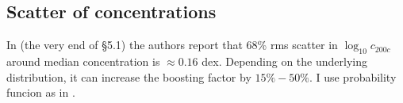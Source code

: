 \subsection{Scatter of concentrations}
In \cite{2014arXiv1407.4730D} (the very end of \S5.1) the authors report that 68\% rms scatter in $\log_{10}c_{200c}$ around median concentration is $\approx 0.16$ dex. Depending on the underlying distribution, it can increase the boosting factor by $15\%-50\%$. I use probability funcion as in \cite{2014arXiv1412.4308M}.